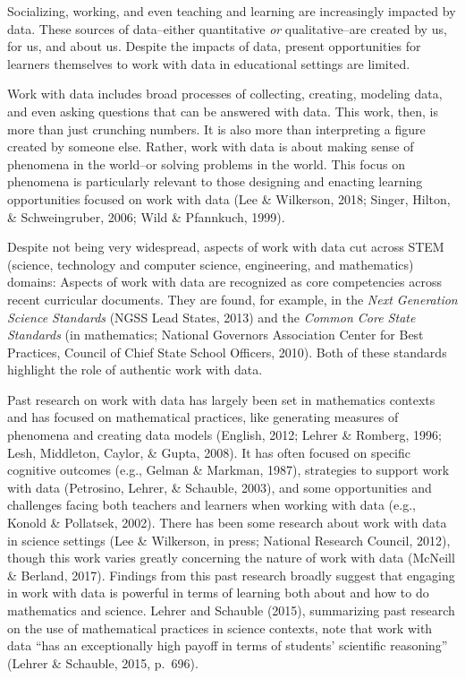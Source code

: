 \documentclass[]{msu-thesis}
\theoremstyle{definition}
\theoremstyle{definition}
\theoremstyle{definition}
\theoremstyle{remark}
\begin{document}
Socializing, working, and even teaching and learning are increasingly
impacted by data. These sources of data--either quantitative \emph{or}
qualitative--are created by us, for us, and about us. Despite the
impacts of data, present opportunities for learners themselves to work
with data in educational settings are limited.

Work with data includes broad processes of collecting, creating,
modeling data, and even asking questions that can be answered with data.
This work, then, is more than just crunching numbers. It is also more
than interpreting a figure created by someone else. Rather, work with
data is about making sense of phenomena in the world--or solving
problems in the world. This focus on phenomena is particularly relevant
to those designing and enacting learning opportunities focused on work
with data (Lee \& Wilkerson, 2018; Singer, Hilton, \& Schweingruber,
2006; Wild \& Pfannkuch, 1999).

Despite not being very widespread, aspects of work with data cut across
STEM (science, technology and computer science, engineering, and
mathematics) domains: Aspects of work with data are recognized as core
competencies across recent curricular documents. They are found, for
example, in the \emph{Next Generation Science Standards} (NGSS Lead
States, 2013) and the \emph{Common Core State Standards} (in
mathematics; National Governors Association Center for Best Practices,
Council of Chief State School Officers, 2010). Both of these standards
highlight the role of authentic work with data.

Past research on work with data has largely been set in mathematics
contexts and has focused on mathematical practices, like generating
measures of phenomena and creating data models (English, 2012; Lehrer \&
Romberg, 1996; Lesh, Middleton, Caylor, \& Gupta, 2008). It has often
focused on specific cognitive outcomes (e.g., Gelman \& Markman, 1987),
strategies to support work with data (Petrosino, Lehrer, \& Schauble,
2003), and some opportunities and challenges facing both teachers and
learners when working with data (e.g., Konold \& Pollatsek, 2002). There
has been some research about work with data in science settings (Lee \&
Wilkerson, in press; National Research Council, 2012), though this work
varies greatly concerning the nature of work with data (McNeill \&
Berland, 2017). Findings from this past research broadly suggest that
engaging in work with data is powerful in terms of learning both about
and how to do mathematics and science. Lehrer and Schauble (2015),
summarizing past research on the use of mathematical practices in
science contexts, note that work with data ``has an exceptionally high
payoff in terms of students' scientific reasoning'' (Lehrer \& Schauble,
2015, p.~696).
\end{document}
